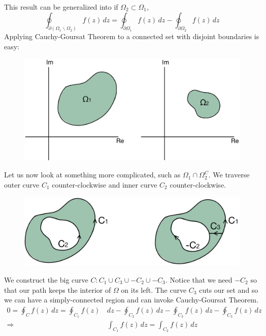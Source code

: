 \documentclass[11pt]{article}
\begin{document}
This result can be generalized into if $\Omega_2 \subset \Omega_1$, 
$$ \oint_{\partial(\Omega_1 \backslash \Omega_2)}f(z) \, dz = \oint_{\partial \Omega_1} f(z) \, dz - \oint_{\partial \Omega_2} f(z) \, dz$$
Applying Cauchy-Goursat Theorem to a connected set with disjoint boundaries is easy: 
\begin{figure}[H]
\includegraphics[scale = 0.2]{13_2}
\centering
\end{figure}
Let us now look at something more complicated, such as $\Omega_1 \cap \Omega_2^C$. We traverse outer curve $C_1$ counter-clockwise and inner curve $C_2$ counter-clockwise. 
\begin{figure}[H]
\includegraphics[scale = 0.2]{13_3}
\centering
\end{figure}
We construct the big curve $C: C_1 \cup C_3 \cup -C_2 \cup -C_3$. Notice that we need $-C_2$ so that our path keeps the interior of $\Omega$ on its left. The curve $C_3$ cuts our set and so we can have a simply-connected region and can invoke Cauchy-Goursat Theorem. 
\begin{align*}
0 = \oint_{C}f(z) \, dz = \oint_{C_1} f(z) \, &dz - \oint_{C_2} f(z) \, dz - \oint_{C_3} f(z) \, dz - \oint_{C_3} f(z) \, dz \\ 
\Longrightarrow &\int_{C_1}f(z) \, dz = \int_{C_2}f(z) \, dz
\end{align*}
\end{document}
